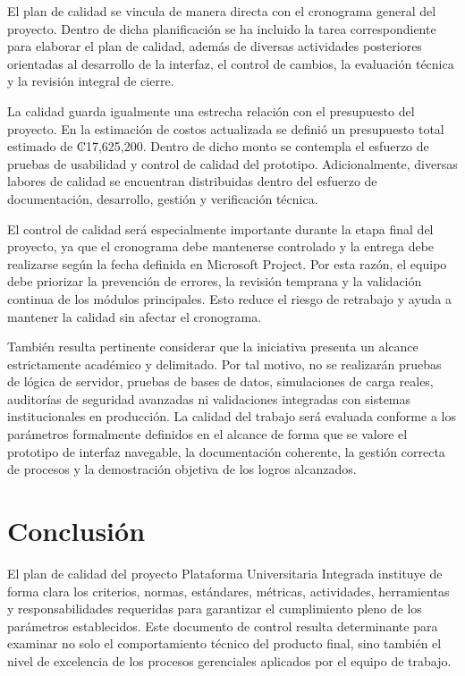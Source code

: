 \documentclass[11pt,spanish]{article}
\begin{document}
El plan de calidad se vincula de manera directa con el cronograma general del proyecto. Dentro de dicha planificación se ha incluido la tarea correspondiente para elaborar el plan de calidad, además de diversas actividades posteriores orientadas al desarrollo de la interfaz, el control de cambios, la evaluación técnica y la revisión integral de cierre.

La calidad guarda igualmente una estrecha relación con el presupuesto del proyecto. En la estimación de costos actualizada se definió un presupuesto total estimado de ₡17,625,200. Dentro de dicho monto se contempla el esfuerzo de pruebas de usabilidad y control de calidad del prototipo. Adicionalmente, diversas labores de calidad se encuentran distribuidas dentro del esfuerzo de documentación, desarrollo, gestión y verificación técnica.

El control de calidad será especialmente importante durante la etapa final del proyecto, ya que el cronograma debe mantenerse controlado y la entrega debe realizarse según la fecha definida en Microsoft Project. Por esta razón, el equipo debe priorizar la prevención de errores, la revisión temprana y la validación continua de los módulos principales. Esto reduce el riesgo de retrabajo y ayuda a mantener la calidad sin afectar el cronograma.

También resulta pertinente considerar que la iniciativa presenta un alcance estrictamente académico y delimitado. Por tal motivo, no se realizarán pruebas de lógica de servidor, pruebas de bases de datos, simulaciones de carga reales, auditorías de seguridad avanzadas ni validaciones integradas con sistemas institucionales en producción. La calidad del trabajo será evaluada conforme a los parámetros formalmente definidos en el alcance de forma que se valore el prototipo de interfaz navegable, la documentación coherente, la gestión correcta de procesos y la demostración objetiva de los logros alcanzados.

\section{Conclusión}

El plan de calidad del proyecto Plataforma Universitaria Integrada instituye de forma clara los criterios, normas, estándares, métricas, actividades, herramientas y responsabilidades requeridas para garantizar el cumplimiento pleno de los parámetros establecidos. Este documento de control resulta determinante para examinar no solo el comportamiento técnico del producto final, sino también el nivel de excelencia de los procesos gerenciales aplicados por el equipo de trabajo.
\end{document}
